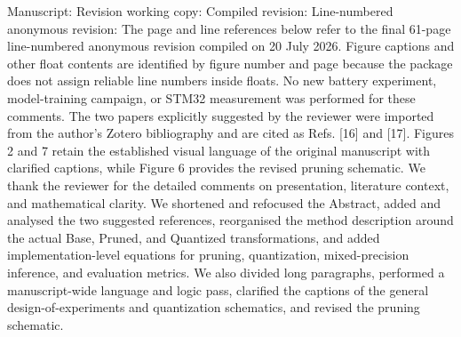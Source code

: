 \markdownRendererDocumentBegin
\markdownRendererSectionBegin
{}\markdownRendererInterblockSeparator
{}Manuscript: \markdownRendererParagraphSeparator
{}Revision working copy: \markdownRendererParagraphSeparator
{}Compiled revision: \markdownRendererParagraphSeparator
{}Line-numbered anonymous revision: \markdownRendererParagraphSeparator
{}The page and line references below refer to the final 61-page line-numbered anonymous revision compiled on 20 July 2026. Figure captions and other float contents are identified by figure number and page because the  package does not assign reliable line numbers inside floats. No new battery experiment, model-training campaign, or STM32 measurement was performed for these comments. The two papers explicitly suggested by the reviewer were imported from the author's Zotero bibliography and are cited as Refs. [16] and [17]. Figures 2 and 7 retain the established visual language of the original manuscript with clarified captions, while Figure 6 provides the revised pruning schematic.\markdownRendererInterblockSeparator
{}\markdownRendererSectionBegin
{}\markdownRendererInterblockSeparator
{}We thank the reviewer for the detailed comments on presentation, literature context, and mathematical clarity. We shortened and refocused the Abstract, added and analysed the two suggested references, reorganised the method description around the actual Base, Pruned, and Quantized transformations, and added implementation-level equations for pruning, quantization, mixed-precision inference, and evaluation metrics. We also divided long paragraphs, performed a manuscript-wide language and logic pass, clarified the captions of the general design-of-experiments and quantization schematics, and revised the pruning schematic.\markdownRendererInterblockSeparator
